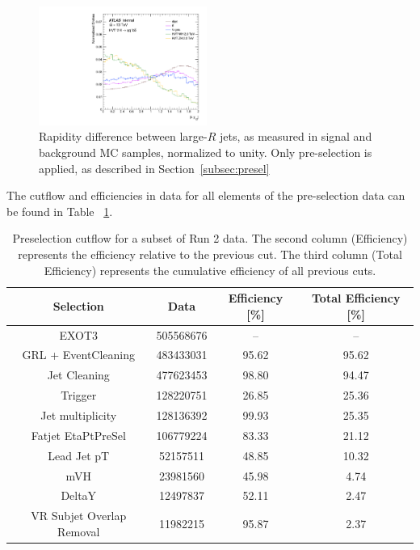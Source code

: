 \begin{figure}[htbp!]
\begin{center}
    \includegraphics[width=0.49\textwidth]{VHqqbb_SimpleSigBkgMC_dyVH.pdf}
\end{center}
\caption{Rapidity difference between large-$R$ jets, as measured in signal and background MC samples, normalized to unity. Only pre-selection is applied, as described in Section~\ref{subsec:presel} }
\label{fig:simple_mc_rapidity}
\end{figure}

The cutflow and efficiencies in data for all elements of the pre-selection data can be found in Table ~\ref{tab:data_cutflow}.

\begin{table}[htbp!]
\normalsize
\centering
\begin{tabular}{c||ccc}
    Selection & Data & Efficiency [\%] & Total Efficiency [\%] \\ \hline
    EXOT3                     & 505568676 & --    & -- \\ \hline
    GRL + EventCleaning       & 483433031 & 95.62 & 95.62 \\ \hline
    Jet Cleaning              & 477623453 & 98.80 & 94.47 \\ \hline
    Trigger                   & 128220751 & 26.85 & 25.36 \\ \hline
    Jet multiplicity          & 128136392 & 99.93 & 25.35 \\ \hline
    Fatjet EtaPtPreSel        & 106779224 & 83.33 & 21.12 \\ \hline
    Lead Jet pT               & 52157511  & 48.85 & 10.32 \\ \hline
    mVH                       & 23981560  & 45.98 & 4.74 \\ \hline
    DeltaY                    & 12497837  & 52.11 & 2.47 \\ \hline
    VR Subjet Overlap Removal & 11982215  & 95.87 & 2.37 \\
\end{tabular}
\caption{
    Preselection cutflow for a subset of Run 2 data.
    The second column (Efficiency) represents the efficiency relative to the previous cut.
    The third column (Total Efficiency) represents the cumulative efficiency of all previous cuts.
}
\label{tab:data_cutflow}
\end{table}
 
